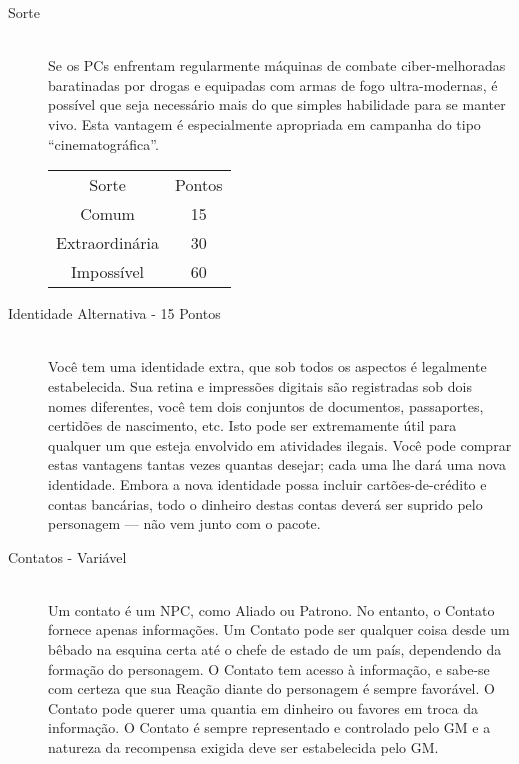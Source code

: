 \documentclass[a4paper]{article}
\begin{document}
\begin{description}
\begin{table}[h]
{\begin{tabular}{ l l }
 \end{tabular} }
\end{table}
  \item[Sorte] \hfill \\ Se os PCs enfrentam regularmente máquinas de combate
ciber-melhoradas baratinadas por drogas e equipadas com
armas de fogo ultra-modernas, é possível que seja necessário
mais do que simples habilidade para se manter vivo. Esta
vantagem é especialmente apropriada em campanha do tipo
“cinematográfica”.
\begin{table}[h]
 \centering
 {\renewcommand\arraystretch{1.25}
 \begin{tabular}{ l l }
  \cline{1-1}\cline{2-2}  
    \multicolumn{1}{|c|}{Sorte \centering } &
    \multicolumn{1}{c|}{Pontos \centering }
  \\  
  \cline{1-1}\cline{2-2}  
    \multicolumn{1}{|c|}{Comum \centering } &
    \multicolumn{1}{c|}{15 \centering }
  \\  
  \cline{1-1}\cline{2-2}  
    \multicolumn{1}{|c|}{Extraordinária \centering } &
    \multicolumn{1}{c|}{30 \centering }
  \\  
  \cline{1-1}\cline{2-2}  
    \multicolumn{1}{|c|}{Impossível \centering } &
    \multicolumn{1}{c|}{60 \centering }
  \\  
  \hline

 \end{tabular} }
\end{table}
  \item[Identidade Alternativa - 15 Pontos] \hfill \\ Você tem uma identidade extra, que sob todos os aspectos é
legalmente estabelecida. Sua retina e impressões digitais são
registradas sob dois nomes diferentes, você tem dois conjuntos
de documentos, passaportes, certidões de nascimento, etc. Isto
pode ser extremamente útil para qualquer um que esteja envolvido
em atividades ilegais. Você pode comprar estas vantagens tantas
vezes quantas desejar; cada uma lhe dará uma nova identidade.
Embora a nova identidade possa incluir cartões-de-crédito e
contas bancárias, todo o dinheiro destas contas deverá ser
suprido pelo personagem — não vem junto com o pacote.
  \item[Contatos - Variável] \hfill \\ Um contato é um NPC, como Aliado ou Patrono. No entanto, o
Contato fornece apenas informações. Um Contato pode ser qualquer
coisa desde um bêbado na esquina certa até o chefe de estado de um país,
dependendo da formação do personagem. O Contato tem acesso à
informação, e sabe-se com certeza que sua Reação diante do personagem
é sempre favorável. O Contato pode querer uma quantia em dinheiro ou
favores em troca da informação. O Contato é sempre representado e
controlado pelo GM e a natureza da recompensa exigida deve ser
estabelecida pelo GM.


\end{description}
\end{document}
